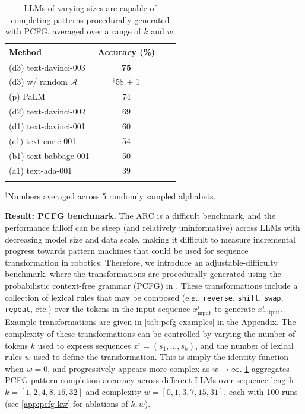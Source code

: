 \documentclass{article}
\renewcommand{\tt}[1]{{\texttt{#1}}}
\newcommand{\eg}{e.g., }
\begin{document}
\begin{table}
    \vspace{-1.1em}
    \small
    \setlength\tabcolsep{3.5pt}
    \centering
    \begin{tabular}{@{}lccc@{}}
    \toprule
    Method & Accuracy (\%) \\
    \midrule
    (d3) text-davinci-003 & \textbf{75} \\
    (d3) w/ random $\mathcal{A}$ &  $^\dagger$58 $\pm$ 1 \\
    (p) PaLM \cite{chowdhery2022palm,anil2023palm} & 74 \\
    (d2) text-davinci-002 \cite{ouyang2022training} & 69 \\
    (d1) text-davinci-001 \cite{brown2020language} & 60 \\
    (c1) text-curie-001 &  54 \\
    (b1) text-babbage-001 & 50 \\
    (a1) text-ada-001 & 39 \\
    \bottomrule
    \vspace{-0.7em}
    \end{tabular}
    \scriptsize
    $^\dagger$Numbers averaged across 5 randomly sampled alphabets.
    \vspace{-2.0em}
    \caption{
    \small
    LLMs of varying sizes are capable of completing patterns procedurally generated with PCFG, averaged over a range of $k$ and $w$.
    \vspace{-2em}
    }
    \label{tab:pcfg-results}
    \vspace{1em}
\end{table}
\textbf{Result: PCFG benchmark.} The ARC is a difficult benchmark, and the performance falloff can be steep (and relatively uninformative) across LLMs with decreasing model size and data scale, making it difficult to measure incremental progress towards pattern machines that could be used for sequence transformation in robotics. Therefore, we introduce an adjustable-difficulty benchmark, where the transformations are procedurally generated using the probabilistic context-free grammar (PCFG) in \citet{hupkes2020compositionality}.
These transformations include a collection of lexical rules that may be composed (\eg \tt{reverse}, \tt{shift}, \tt{swap}, \tt{repeat}, etc.) over the tokens in the input sequence $x^{i}_{\text{input}}$ to generate $x^{i}_{\text{output}}$.
Example transformations are given in \cref{tab:pcfg-examples} in the Appendix.
The complexity of these transformations can be controlled by varying the number of tokens $k$ used to express sequences $x^i=(s_1,\dots,s_k)$, and the number of lexical rules $w$ used to define the transformation. This is simply the identity function when $w=0$, and progressively appears more complex as $w\rightarrow\infty$. \cref{tab:pcfg-results} aggregates PCFG pattern completion accuracy across different LLMs over sequence length $k = [1, 2, 4, 8, 16, 32]$ and complexity $w = [0, 1, 3, 7, 15, 31]$, each with 100 runs (see \cref{app:pcfg-kw} for ablations of $k, w$).
\end{document}
